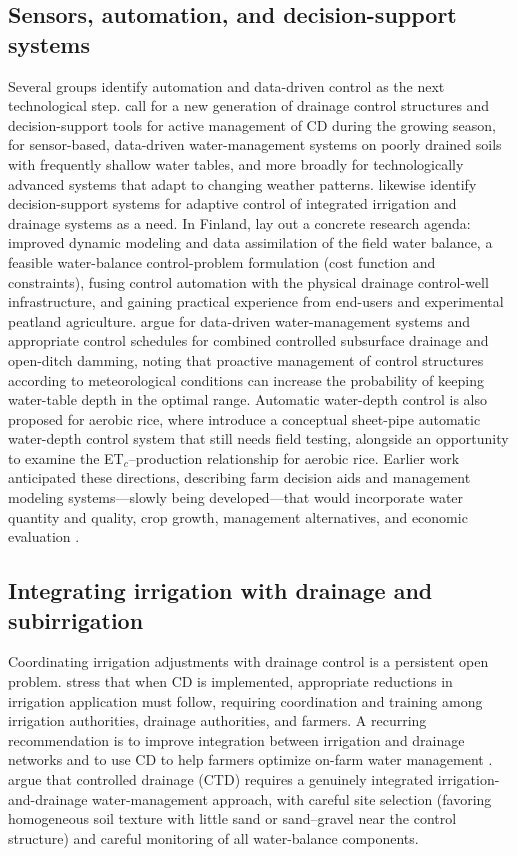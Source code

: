 \subsection{Sensors, automation, and decision-support systems}
Several groups identify automation and data-driven control as the next technological step. \textcite{Youssef2023} call for a new generation of drainage control structures and decision-support tools for active management of CD during the growing season, for sensor-based, data-driven water-management systems on poorly drained soils with frequently shallow water tables, and more broadly for technologically advanced systems that adapt to changing weather patterns. \textcite{Ayars2015} likewise identify decision-support systems for adaptive control of integrated irrigation and drainage systems as a need. In Finland, \textcite{Ikonen2023} lay out a concrete research agenda: improved dynamic modeling and data assimilation of the field water balance, a feasible water-balance control-problem formulation (cost function and constraints), fusing control automation with the physical drainage control-well infrastructure, and gaining practical experience from end-users and experimental peatland agriculture. \textcite{Isomäki2024} argue for data-driven water-management systems and appropriate control schedules for combined controlled subsurface drainage and open-ditch damming, noting that proactive management of control structures according to meteorological conditions can increase the probability of keeping water-table depth in the optimal range. Automatic water-depth control is also proposed for aerobic rice, where \textcite{Arif2021} introduce a conceptual sheet-pipe automatic water-depth control system that still needs field testing, alongside an opportunity to examine the ET$_c$--production relationship for aerobic rice. Earlier work anticipated these directions, describing farm decision aids and management modeling systems---slowly being developed---that would incorporate water quantity and quality, crop growth, management alternatives, and economic evaluation \parencite{THOMAS1995}.

\subsection{Integrating irrigation with drainage and subirrigation}
Coordinating irrigation adjustments with drainage control is a persistent open problem. \textcite{Wahba2005} stress that when CD is implemented, appropriate reductions in irrigation application must follow, requiring coordination and training among irrigation authorities, drainage authorities, and farmers. A recurring recommendation is to improve integration between irrigation and drainage networks and to use CD to help farmers optimize on-farm water management \parencite{Ritzema2011,Ritzema2016}. \textcite{Dukhovny2018} argue that controlled drainage (CTD) requires a genuinely integrated irrigation-and-drainage water-management approach, with careful site selection (favoring homogeneous soil texture with little sand or sand--gravel near the control structure) and careful monitoring of all water-balance components.

